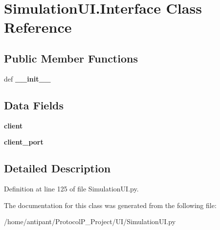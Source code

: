 \hypertarget{classSimulationUI_1_1Interface}{\section{Simulation\-U\-I.\-Interface Class Reference}
\label{classSimulationUI_1_1Interface}
}
\subsection*{Public Member Functions}
\begin{DoxyCompactItemize}
\item 
\hypertarget{classSimulationUI_1_1Interface_a777ae8d90b540d4086db55b9c46c240b}{def {\bfseries \-\_\-\-\_\-init\-\_\-\-\_\-}}\label{classSimulationUI_1_1Interface_a777ae8d90b540d4086db55b9c46c240b}

\end{DoxyCompactItemize}
\subsection*{Data Fields}
\begin{DoxyCompactItemize}
\item 
\hypertarget{classSimulationUI_1_1Interface_a01a5b1f9a954b3c7f1d17a43bbb82c8f}{{\bfseries client}}\label{classSimulationUI_1_1Interface_a01a5b1f9a954b3c7f1d17a43bbb82c8f}

\item 
\hypertarget{classSimulationUI_1_1Interface_a2a25e845a2944548d65bb228a3a03630}{{\bfseries client\-\_\-port}}\label{classSimulationUI_1_1Interface_a2a25e845a2944548d65bb228a3a03630}

\end{DoxyCompactItemize}


\subsection{Detailed Description}


Definition at line 125 of file Simulation\-U\-I.\-py.



The documentation for this class was generated from the following file\-:\begin{DoxyCompactItemize}
\item 
/home/antipant/\-Protocol\-P\-\_\-\-Project/\-U\-I/Simulation\-U\-I.\-py\end{DoxyCompactItemize}
